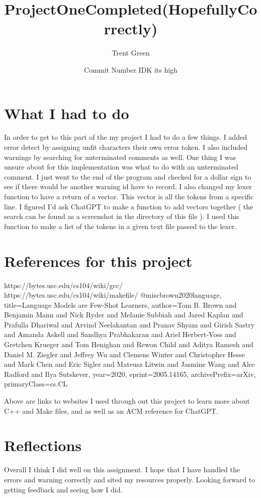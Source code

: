 \documentclass{article}
\title{ProjectOneCompleted(HopefullyCorrectly)}
\author{Trent Green}
\date{Commit Number IDK its high}
\begin{document}
\maketitle

\section{What I had to do}
In order to get to this part of the my project I had to do a few things. I added error detect by assigning unfit characters their own error token. I also included warnings by searching for unterminated comments as well. One thing I was unsure about for this implementation was what to do with an unterminated comment. I just went to the end of the program and checked for a dollar sign to see if there would be another warning id have to record. I also changed my lexer function to have a return of a vector. This vector is all the tokens from a specific line. I figured I'd ask ChatGPT to make a function to add vectors together ( the search can be found as a screenshot in the directory of this file ). I used this function to make a list of the tokens in a given text file passed to the lexer.

\section{References for this project}
https://bytes.usc.edu/cs104/wiki/gcc/ https://bytes.usc.edu/cs104/wiki/makefile/ @misc{brown2020language, title={Language Models are Few-Shot Learners}, author={Tom B. Brown and Benjamin Mann and Nick Ryder and Melanie Subbiah and Jared Kaplan and Prafulla Dhariwal and Arvind Neelakantan and Pranav Shyam and Girish Sastry and Amanda Askell and Sandhya Prabhakaran and Ariel Herbert-Voss and Gretchen Krueger and Tom Henighan and Rewon Child and Aditya Ramesh and Daniel M. Ziegler and Jeffrey Wu and Clemens Winter and Christopher Hesse and Mark Chen and Eric Sigler and Mateusz Litwin and Jasmine Wang and Alec Radford and Ilya Sutskever}, year={2020}, eprint={2005.14165}, archivePrefix={arXiv}, primaryClass={cs.CL} }

Above are links to websites I used through out this project to learn more about C++ and Make files, and as well as an ACM reference for ChatGPT.

\section{Reflections}
Overall I think I did well on this assignment. I hope that I have handled the errors and warning correctly and sited my resources properly. Looking forward to getting feedback and seeing how I did. 
\end{document}
